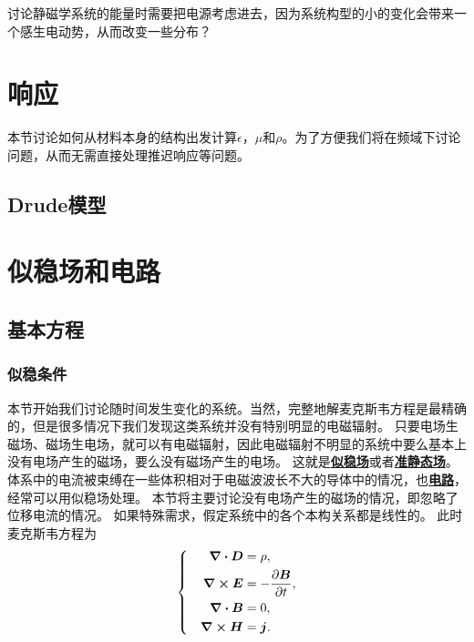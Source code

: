 \documentclass[UTF8, a4paper]{ctexart}
\newcommand*{\concept}[1]{\underline{\textbf{#1}}}
\newenvironment{bigcase}{\left\{\quad\begin{aligned}}{\end{aligned}\right.}
\begin{document}
讨论静磁学系统的能量时需要把电源考虑进去，因为系统构型的小的变化会带来一个感生电动势，从而改变一些分布？

\section{响应}

本节讨论如何从材料本身的结构出发计算$\epsilon$，$\mu$和$\rho$。为了方便我们将在频域下讨论问题，从而无需直接处理推迟响应等问题。

\subsection{Drude模型}



\section{似稳场和电路}

\subsection{基本方程}

\subsubsection{似稳条件}

本节开始我们讨论随时间发生变化的系统。当然，完整地解麦克斯韦方程是最精确的，但是很多情况下我们发现这类系统并没有特别明显的电磁辐射。
只要电场生磁场、磁场生电场，就可以有电磁辐射，因此电磁辐射不明显的系统中要么基本上没有电场产生的磁场，要么没有磁场产生的电场。 %
这就是\concept{似稳场}或者\concept{准静态场}。体系中的电流被束缚在一些体积相对于电磁波波长不大的导体中的情况，也\concept{电路}，经常可以用似稳场处理。
本节将主要讨论没有电场产生的磁场的情况，即忽略了位移电流的情况。
如果特殊需求，假定系统中的各个本构关系都是线性的。
此时麦克斯韦方程为
\begin{equation}
    \begin{bigcase}
        \div{\vb*{D}} &= \rho, \\
        \curl{\vb*{E}} &= - \pdv{\vb*{B}}{t}, \\
        \div{\vb*{B}} &= 0, \\
        \curl{\vb*{H}} &= \vb*{j}.
    \end{bigcase}
\end{equation}
\end{document}
